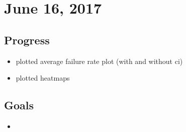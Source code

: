 \documentclass{article}
\begin{document}
\section{June 16, 2017}
\subsection{Progress}
\begin{itemize}
  \item plotted average failure rate plot (with and without ci)
  \item plotted heatmaps
\end{itemize}

\subsection{Goals}
\begin{itemize}
  \item
\end{itemize}




\end{document}
